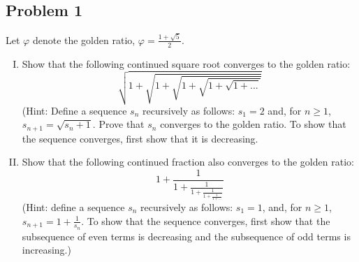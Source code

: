 \documentclass[12pt]{article}
\theoremstyle{definition}
\begin{document}
\subsection{Problem 1}
Let $\varphi$ denote the golden ratio, $\varphi = \frac{1 + \sqrt{5}}{2}$. 
\begin{enumerate}[(I)]
    \item Show that the following continued square root converges to the golden ratio:
    \[
        \sqrt{ 1 + \sqrt{ 1 + \sqrt{ 1 + \sqrt{ 1 + \sqrt{ 1 + ... } } } } }
    \]
    (Hint: Define a sequence $s_n$ recursively as follows: $s_1 = 2$ and, for $n \geq 1$, $s_{n+1} = \sqrt{s_n + 1}$. Prove that $s_n$ converges to the golden ratio. To show that the sequence converges, first show that it is decreasing. 
    \item Show that the following continued fraction also converges to the golden ratio: 
    \[
        1 + \frac{1}{ 1 + \frac{1}{ 1 + \frac{1}{1 + \frac{1}{1 + ...}} } }
    \]
    (Hint: define a sequence $s_n$ recursively as follows: $s_1 = 1$, and, for $n \geq 1$, $s_{n+1} = 1 + \frac{1}{s_n}$. To show that the sequence converges, first show that the subsequence of even terms is decreasing and the subsequence of odd terms is increasing.) 
\end{enumerate}
\end{document}
